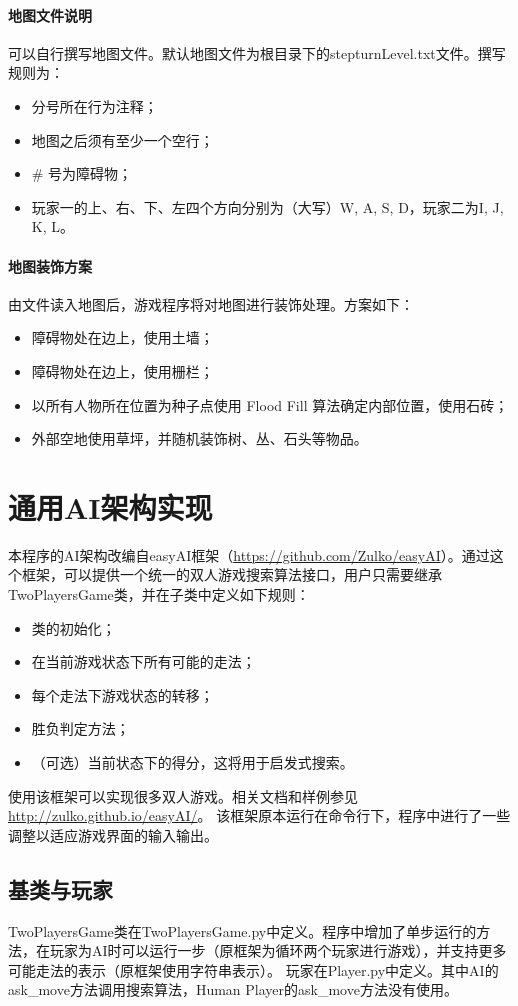 \paragraph{地图文件说明}
可以自行撰写地图文件。默认地图文件为根目录下的{\ttfamily stepturnLevel.txt}文件。撰写规则为：
\begin{itemize}
	\item 分号所在行为注释；
	\item 地图之后须有至少一个空行；
	\item \# 号为障碍物；
	\item 玩家一的上、右、下、左四个方向分别为（大写）{\ttfamily W, A, S, D}，玩家二为{\ttfamily I, J, K, L}。
\end{itemize}

\paragraph{地图装饰方案}
由文件读入地图后，游戏程序将对地图进行装饰处理。方案如下：
\begin{itemize}
	\item 障碍物处在边上，使用土墙；
	\item 障碍物处在边上，使用栅栏；
	\item 以所有人物所在位置为种子点使用 Flood Fill 算法确定内部位置，使用石砖；
	\item 外部空地使用草坪，并随机装饰树、丛、石头等物品。
\end{itemize}


\section{通用AI架构实现}
本程序的AI架构改编自easyAI框架（\url{https://github.com/Zulko/easyAI}）。通过这个框架，可以提供一个统一的双人游戏搜索算法接口，用户只需要继承{\ttfamily TwoPlayersGame}类，并在子类中定义如下规则：
\begin{itemize}
	\item 类的初始化；
	\item 在当前游戏状态下所有可能的走法；
	\item 每个走法下游戏状态的转移；
	\item 胜负判定方法；
	\item （可选）当前状态下的得分，这将用于启发式搜索。
\end{itemize}
使用该框架可以实现很多双人游戏。相关文档和样例参见\url{http://zulko.github.io/easyAI/}。
该框架原本运行在命令行下，程序中进行了一些调整以适应游戏界面的输入输出。
\subsection{基类与玩家}
{\ttfamily TwoPlayersGame}类在{\ttfamily TwoPlayersGame.py}中定义。程序中增加了单步运行的方法，在玩家为AI时可以运行一步（原框架为循环两个玩家进行游戏），并支持更多可能走法的表示（原框架使用字符串表示）。
玩家在{\ttfamily Player.py}中定义。其中AI的{\ttfamily ask\_move}方法调用搜索算法，Human Player的{\ttfamily ask\_move}方法没有使用。
